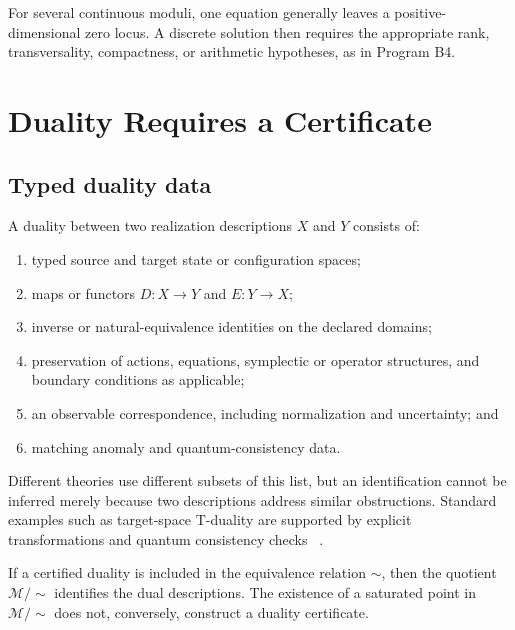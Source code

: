 \documentclass[11pt]{article}
\newcommand{\Mod}{\mathcal M}
\begin{document}
For several continuous moduli, one equation generally leaves a
positive-dimensional zero locus.  A discrete solution then requires the
appropriate rank, transversality, compactness, or arithmetic hypotheses, as
in Program B4.

\section{Duality Requires a Certificate}

\subsection{Typed duality data}

\begin{definition}\label{def:duality}
A duality between two realization descriptions $X$ and $Y$ consists of:
\begin{enumerate}
\item typed source and target state or configuration spaces;
\item maps or functors $D:X\to Y$ and $E:Y\to X$;
\item inverse or natural-equivalence identities on the declared domains;
\item preservation of actions, equations, symplectic or operator structures,
and boundary conditions as applicable;
\item an observable correspondence, including normalization and uncertainty;
and
\item matching anomaly and quantum-consistency data.
\end{enumerate}
\end{definition}

Different theories use different subsets of this list, but an identification
cannot be inferred merely because two descriptions address similar
obstructions.  Standard examples such as target-space T-duality are supported
by explicit transformations and quantum consistency checks
~\cite{Buscher,Polchinski}.

\begin{proposition}\label{prop:duality}
If a certified duality is included in the equivalence relation $\sim$, then
the quotient $\Mod/{\sim}$ identifies the dual descriptions.  The existence of
a saturated point in $\Mod/{\sim}$ does not, conversely, construct a duality
certificate.
\end{proposition}
\end{document}
